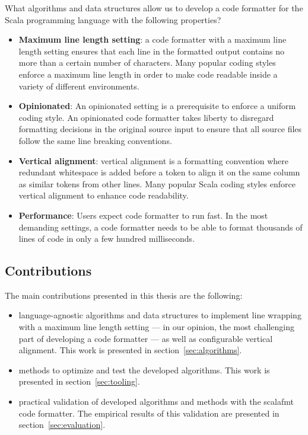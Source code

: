 What algorithms and data structures allow us to develop a code formatter for the Scala programming language with the following properties?
\begin{itemize}
  \item \textbf{Maximum line length setting}: a code formatter with a maximum line length setting ensures that each line in the formatted output contains no more than a certain number of characters.
    Many popular coding styles enforce a maximum line length in order to make code readable inside a variety of different environments.
  \item \textbf{Opinionated}:
    An opinionated setting is a prerequisite to enforce a uniform coding style.
    An opinionated code formatter takes liberty to disregard formatting decisions in the original source input to ensure that all source files follow the same line breaking conventions.
  \item \textbf{Vertical alignment}: vertical alignment is a formatting convention where redundant whitespace is added before a token to align it on the same column as similar tokens from other lines. Many popular Scala coding styles enforce vertical alignment to enhance code readability.
  \item \textbf{Performance}: Users expect code formatter to run fast.
    In the most demanding settings, a code formatter needs to be able to format thousands of lines of code in only a few hundred milliseconds.

\end{itemize}

\subsection{Contributions}
The main contributions presented in this thesis are the following:
\begin{itemize}
  \item language-agnostic algorithms and data structures to implement line
    wrapping with a maximum line length setting --- in our opinion, the most
    challenging part of developing a code formatter --- as well as configurable
    vertical alignment.
    This work is presented in section~\ref{sec:algorithms}.
  \item methods to optimize and test the developed algorithms.
    This work is presented in section~\ref{sec:tooling}.
  \item practical validation of developed algorithms and methods with the scalafmt code formatter.
    The empirical results of this validation are presented in section~\ref{sec:evaluation}.
\end{itemize}
